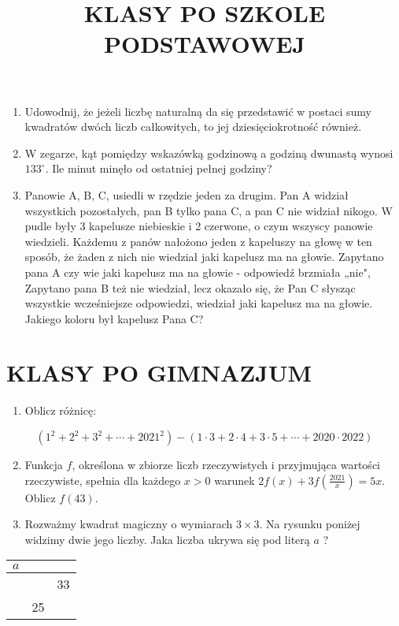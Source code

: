\documentclass[10pt]{article}
\title{KLASY PO SZKOLE PODSTAWOWEJ }
\author{}
\date{}
\begin{document}
\maketitle
\begin{enumerate}
  \item Udowodnij, że jeżeli liczbę naturalną da się przedstawić w postaci sumy kwadratów dwóch liczb całkowitych, to jej dziesięciokrotność również.
  \item W zegarze, kąt pomiędzy wskazówką godzinową a godziną dwunastą wynosi \(133^{\circ}\). Ile minut minęło od ostatniej pełnej godziny?
  \item Panowie A, B, C, usiedli w rzędzie jeden za drugim. Pan A widział wszystkich pozostałych, pan B tylko pana C, a pan C nie widział nikogo. W pudle były 3 kapelusze niebieskie i 2 czerwone, o czym wszyscy panowie wiedzieli. Każdemu z panów nałożono jeden z kapeluszy na głowę w ten sposób, że żaden z nich nie wiedział jaki kapelusz ma na głowie. Zapytano pana A czy wie jaki kapelusz ma na głowie - odpowiedź brzmiała „nie", Zapytano pana B też nie wiedział, lecz okazało się, że Pan C słysząc wszystkie wcześniejsze odpowiedzi, wiedział jaki kapelusz ma na głowie. Jakiego koloru był kapelusz Pana C?
\end{enumerate}

\section*{KLASY PO GIMNAZJUM}
\begin{enumerate}
  \item Oblicz różnicę:
\end{enumerate}

\[
\left(1^{2}+2^{2}+3^{2}+\cdots+2021^{2}\right)-(1 \cdot 3+2 \cdot 4+3 \cdot 5+\cdots+2020 \cdot 2022)
\]

\begin{enumerate}
  \setcounter{enumi}{1}
  \item Funkcja \(f\), określona w zbiorze liczb rzeczywistych i przyjmująca wartości rzeczywiste, spełnia dla każdego \(x>0\) warunek \(2 f(x)+3 f\left(\frac{2021}{x}\right)=5 x\). Oblicz \(f(43)\).
  \item Rozważmy kwadrat magiczny o wymiarach \(3 \times 3\). Na rysunku poniżej widzimy dwie jego liczby. Jaka liczba ukrywa się pod literą \(a\) ?
\end{enumerate}

\begin{center}
\begin{tabular}{|c|l|l|}
\hline
\(a\) &  &  \\
\hline
 &  & 33 \\
\hline
 & 25 &  \\
\hline
\end{tabular}
\end{center}
\end{document}
